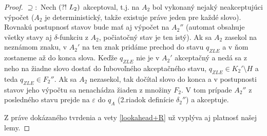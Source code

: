 \begin{proof}
$\supseteq :$ Nech $\text{(?!~} L_2)$ akceptoval, t.j. na $A_2$ bol vykonaný nejaký neakceptujúci výpočet ($A_2$ je deterministický, takže existuje práve jeden pre každé slovo). Rovnakú postupnosť stavov bude mať aj výpočet na $A_2''$ (automat obsahuje všetky stavy aj $\delta$-funkciu z $A_2$, počiatočný stav je ten istý). Ak sa $A_2$ zasekol na neznámom znaku, v $A_2'$ na ten znak pridáme prechod do stavu $q_{ZLE}$ a v ňom zostaneme až do konca slova. Keďže $q_{ZLE}$ nie je v $A_2'$ akceptačný a nedá sa z neho na žiadne slovo dostať do ľubovoľného akceptačného stavu, $q_{ZLE} \in K_2' \setminus H$ a teda $q_{ZLE} \in F_2''$. Ak sa $A_2$ nezasekol, tak dočítal slovo do konca a v postupnosti stavov jeho výpočtu sa nenachádza žiaden z množiny $F_2$. V tom prípade $A_2''$ z posledného stavu prejde na $\varepsilon$ do $q_A$ (2.riadok definície $\delta_2''$) a akceptuje.

Z práve dokázaného tvrdenia a vety \ref{lookahead+R} už vyplýva aj platnosť našej lemy.
\end{proof}

